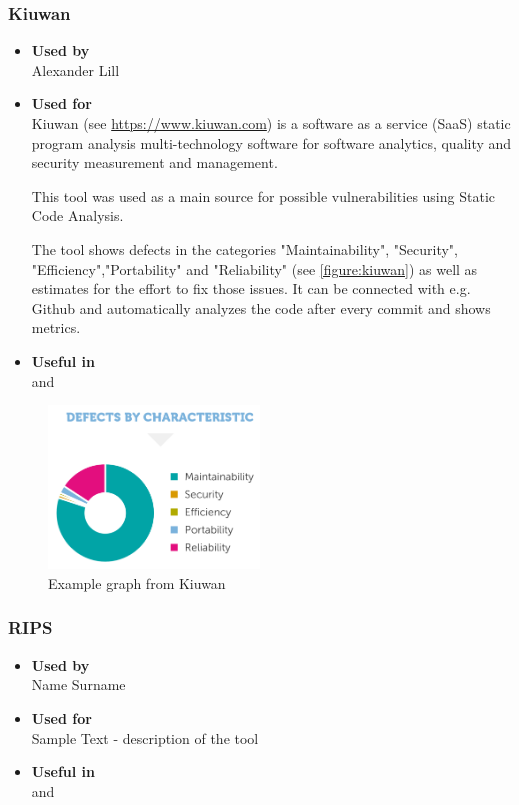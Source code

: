 \subsubsection*{Kiuwan}
\begin{itemize}
	\item \textbf{Used by}\\ Alexander Lill
	\item \textbf{Used for}\\
	Kiuwan (see \url{https://www.kiuwan.com}) is a software as a service (SaaS) static program analysis multi-technology software for software analytics, quality and security measurement and management.
	
	This tool was used as a main source for possible vulnerabilities using Static Code Analysis.
	
	The tool shows defects in the categories "Maintainability", "Security", "Efficiency","Portability" and "Reliability" (see \autoref{figure:kiuwan}) as well as estimates for the effort to fix those issues. It can be connected with e.g. Github and automatically analyzes the code after every commit and shows metrics.
	\item \textbf{Useful in}\\  and 
\end{itemize}

\begin{figure}[h!tbp]
	\centering
	\includegraphics[width=0.5\textwidth]{figures/kiuwanResults}
	\caption{Example graph from Kiuwan}
	\label{figure:kiuwan}
\end{figure}

\subsubsection*{RIPS}
\begin{itemize}
	\item \textbf{Used by}\\ Name Surname
	\item \textbf{Used for}\\ Sample Text - description of the tool
	\item \textbf{Useful in}\\  and 
\end{itemize}

